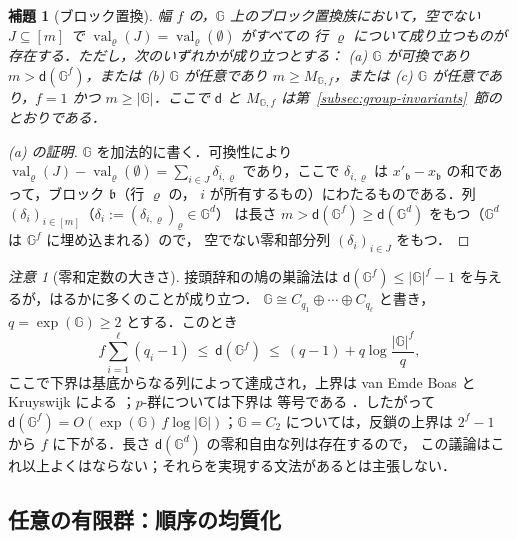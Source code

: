 \documentclass[11pt,a4paper]{ltjsarticle}
\numberwithin{equation}{section}
\theoremstyle{plain}
\newtheorem{lemma}[theorem]{補題}
\theoremstyle{definition}
\theoremstyle{remark}
\newtheorem{remark}[theorem]{注意}
\theoremstyle{plain}
\begin{document}
\begin{lemma}[ブロック置換]
\label{lem:block-replacement}
幅 $f$ の，${\mathbb G}$ 上のブロック置換族において，空でない
$J\subseteq[m]$ で $\operatorname{val}_\varrho(J)=\operatorname{val}_\varrho(\emptyset)$ がすべての
行 $\varrho$ について成り立つものが存在する．ただし，次のいずれかが成り立つとする：
\textup{(a)} ${\mathbb G}$ が可換であり $m>\mathsf d({\mathbb G}^f)$，または
\textup{(b)} ${\mathbb G}$ が任意であり $m\ge M_{{\mathbb G},f}$，または
\textup{(c)} ${\mathbb G}$ が任意であり，$f=1$ かつ $m\ge|{\mathbb G}|$．ここで $\mathsf d$ と
$M_{{\mathbb G},f}$ は第~\ref{subsec:group-invariants}~節のとおりである．
\end{lemma}

\begin{proof}[\textup{(a)} の証明]
${\mathbb G}$ を加法的に書く．可換性により
$\operatorname{val}_\varrho(J)-\operatorname{val}_\varrho(\emptyset)=\sum_{i\in J}\delta_{i,\varrho}$ であり，ここで
$\delta_{i,\varrho}$ は $x'_{\mathfrak b}-x_{\mathfrak b}$ の和であって，ブロック $\mathfrak b$（行 $\varrho$ の，
$i$ が所有するもの）にわたるものである．列 $(\delta_i)_{i\in[m]}$（$\delta_i:=(\delta_{i,\varrho})_\varrho\in {\mathbb G}^d$）
は長さ $m>\mathsf d({\mathbb G}^f)\ge\mathsf d({\mathbb G}^d)$ をもつ（${\mathbb G}^d$ は ${\mathbb G}^f$ に埋め込まれる）ので，
空でない零和部分列 $(\delta_i)_{i\in J}$ をもつ．
\end{proof}

\begin{remark}[零和定数の大きさ]
\label{rem:davenport-size}
接頭辞和の鳩の巣論法は $\mathsf d({\mathbb G}^f)\le|{\mathbb G}|^f-1$ を与えるが，はるかに多くのことが成り立つ．
${\mathbb G}\cong C_{q_1}\oplus\cdots\oplus C_{q_\ell}$ と書き，$q=\exp({\mathbb G})\ge2$ とする．このとき
\[
 f\sum_{i=1}^{\ell}(q_i-1)\ \le\ \mathsf d({\mathbb G}^f)\ \le\ (q-1)+q\log\frac{|{\mathbb G}|^f}{q},
\]
ここで下界は基底からなる列によって達成され，上界は
van Emde Boas と Kruyswijk による \cite[Proposition~5.1.8 and
Theorem~5.5.5]{GeroldingerHalterKoch2006}；$p$-群については下界は
等号である \cite[Theorem~5.5.9]{GeroldingerHalterKoch2006}．したがって
$\mathsf d({\mathbb G}^f)=O(\exp({\mathbb G})\,f\log|{\mathbb G}|)$；${\mathbb G}=C_2$ については，反鎖の上界は
$2^f-1$ から $f$ に下がる．長さ $\mathsf d({\mathbb G}^d)$ の零和自由な列は存在するので，
この議論はこれ以上よくはならない；それらを実現する文法があるとは主張しない．
\end{remark}

\subsection{任意の有限群：順序の均質化}
\label{app:window-group}
\end{document}

